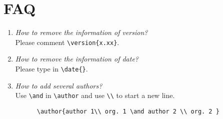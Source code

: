 \documentclass[en,hazy,blue,screen,14pt]{elegantnote}
\begin{document}
\section{FAQ}

\begin{enumerate}[label=\arabic*).]
	\item \textit{How to remove the information of version?}\\
    Please comment \lstinline|\version{x.xx}|.
	\item \textit{How to remove the information of date?}\\
	  Please type in \lstinline|\date{}|.
	\item \textit{How to add several authors?}\\
	  Use \lstinline{\and} in \lstinline{\author} and use \lstinline{\\} to start a new line.
    \begin{lstlisting}
      \author{author 1\\ org. 1 \and author 2 \\ org. 2 }
    \end{lstlisting}
\end{enumerate}


\end{document}
